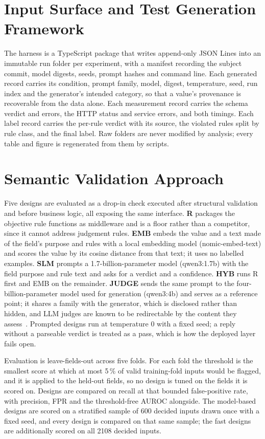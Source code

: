 \documentclass[conference]{IEEEtran}
\begin{document}
\section{Input Surface and Test Generation Framework}
\label{sec:framework}

The harness is a TypeScript package that writes append-only JSON Lines into an immutable run folder
per experiment, with a manifest recording the subject commit, model digests, seeds, prompt hashes and
command line. Each generated record carries its condition, prompt family, model, digest, temperature,
seed, run index and the generator's intended category, so that a value's provenance is recoverable
from the data alone. Each measurement record carries the schema verdict and errors, the HTTP status
and service errors, and both timings. Each label record carries the per-rule verdict with its source,
the violated rules split by rule class, and the final label. Raw folders are never modified by
analysis; every table and figure is regenerated from them by scripts.

\section{Semantic Validation Approach}
\label{sec:layer}

Five designs are evaluated as a drop-in check executed after structural validation and before
business logic, all exposing the same interface. \textbf{R} packages the objective rule functions as
middleware and is a floor rather than a competitor, since it cannot address judgement rules.
\textbf{EMB} embeds the value and a text made of the field's purpose and rules with a local
embedding model (nomic-embed-text) and scores the value by its cosine distance from that text; it
uses no labelled examples. \textbf{SLM} prompts a 1.7-billion-parameter model (qwen3:1.7b) with the
field purpose and rule text and asks for a verdict and a confidence. \textbf{HYB} runs R first and
EMB on the remainder. \textbf{JUDGE} sends the same prompt to the four-billion-parameter model used
for generation (qwen3:4b) and serves as a reference point; it shares a family with the generator,
which is disclosed rather than hidden, and LLM judges are known to be redirectable by the content
they assess~\cite{shi2024judgeattack}. Prompted designs run at temperature 0 with a fixed seed; a
reply without a parseable verdict is treated as a pass, which is how the deployed layer fails open.

Evaluation is leave-fields-out across five folds. For each fold the threshold is the smallest score
at which at most 5\,\% of valid training-fold inputs would be flagged, and it is applied to the
held-out fields, so no design is tuned on the fields it is scored on. Designs are compared on recall
at that bounded false-positive rate, with precision, FPR and the threshold-free AUROC alongside. The
model-based designs are scored on a stratified sample of 600 decided inputs drawn once with a fixed
seed, and every design is compared on that same sample; the fast designs are additionally scored on
all 2108 decided inputs.
\end{document}
